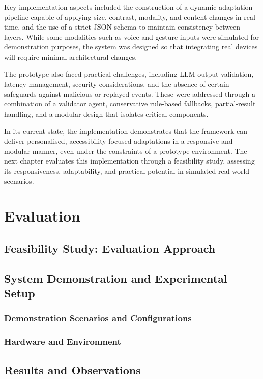 \documentclass[openany]{book}
\begin{document}
Key implementation aspects included the construction of a dynamic adaptation pipeline capable of applying size, contrast, modality, and content changes in real time, and the use of a strict JSON schema to maintain consistency between layers. While some modalities such as voice and gesture inputs were simulated for demonstration purposes, the system was designed so that integrating real devices will require minimal architectural changes.

The prototype also faced practical challenges, including LLM output validation, latency management, security considerations, and the absence of certain safeguards against malicious or replayed events. These were addressed through a combination of a validator agent, conservative rule-based fallbacks, partial-result handling, and a modular design that isolates critical components.

In its current state, the implementation demonstrates that the framework can deliver personalised, accessibility-focused adaptations in a responsive and modular manner, even under the constraints of a prototype environment. The next chapter evaluates this implementation through a feasibility study, assessing its responsiveness, adaptability, and practical potential in simulated real-world scenarios.

\chapter{Evaluation}
\section{Feasibility Study: Evaluation Approach}
\section{System Demonstration and Experimental Setup}
    \subsection{Demonstration Scenarios and Configurations}
    \subsection{Hardware and Environment}
\section{Results and Observations}
\end{document}
